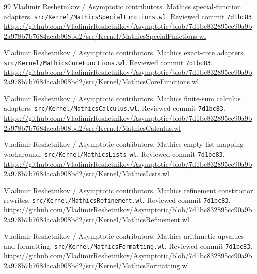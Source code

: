 \documentclass[11pt,letterpaper]{article}
\newcommand{\code}[1]{\nolinkurl{#1}}
\begin{document}
\begin{thebibliography}{99}
 Vladimir Reshetnikov / Asymptotic contributors. Mathics special-function adapters.\newline
\code{src/Kernel/MathicsSpecialFunctions.wl}. Reviewed commit \code{7d1bc83}.\newline
\url{https://github.com/VladimirReshetnikov/Asymptotic/blob/7d1bc832895cc90a9b2a978b7b7684acab908bd2/src/Kernel/MathicsSpecialFunctions.wl}

 Vladimir Reshetnikov / Asymptotic contributors. Mathics exact-core adapters.\newline
\code{src/Kernel/MathicsCoreFunctions.wl}. Reviewed commit \code{7d1bc83}.\newline
\url{https://github.com/VladimirReshetnikov/Asymptotic/blob/7d1bc832895cc90a9b2a978b7b7684acab908bd2/src/Kernel/MathicsCoreFunctions.wl}

 Vladimir Reshetnikov / Asymptotic contributors. Mathics finite-sum calculus adapters.\newline
\code{src/Kernel/MathicsCalculus.wl}. Reviewed commit \code{7d1bc83}.\newline
\url{https://github.com/VladimirReshetnikov/Asymptotic/blob/7d1bc832895cc90a9b2a978b7b7684acab908bd2/src/Kernel/MathicsCalculus.wl}

 Vladimir Reshetnikov / Asymptotic contributors. Mathics empty-list mapping workaround.\newline
\code{src/Kernel/MathicsLists.wl}. Reviewed commit \code{7d1bc83}.\newline
\url{https://github.com/VladimirReshetnikov/Asymptotic/blob/7d1bc832895cc90a9b2a978b7b7684acab908bd2/src/Kernel/MathicsLists.wl}

 Vladimir Reshetnikov / Asymptotic contributors. Mathics refinement constructor rewrites.\newline
\code{src/Kernel/MathicsRefinement.wl}. Reviewed commit \code{7d1bc83}.\newline
\url{https://github.com/VladimirReshetnikov/Asymptotic/blob/7d1bc832895cc90a9b2a978b7b7684acab908bd2/src/Kernel/MathicsRefinement.wl}

 Vladimir Reshetnikov / Asymptotic contributors. Mathics arithmetic upvalues and formatting.\newline
\code{src/Kernel/MathicsFormatting.wl}. Reviewed commit \code{7d1bc83}.\newline
\url{https://github.com/VladimirReshetnikov/Asymptotic/blob/7d1bc832895cc90a9b2a978b7b7684acab908bd2/src/Kernel/MathicsFormatting.wl}


\end{thebibliography}
\end{document}
